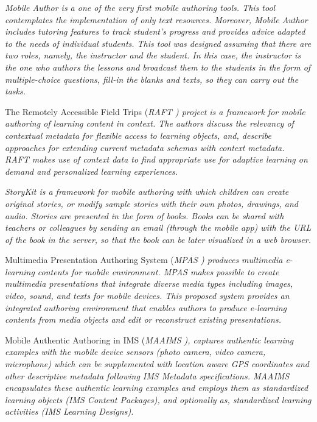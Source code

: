 \begin{small}

\em Mobile Author \em \cite{Virvou2005} is a one of the very first mobile authoring tools. This tool contemplates the implementation of only text resources. Moreover, \em Mobile Author \em includes tutoring features to track student’s progress and provides advice adapted to the needs of individual students. This tool was designed assuming that there are two roles, namely, the instructor and the student. In this case, the instructor is the one who authors the lessons and broadcast them to the students in the form of multiple-choice questions, fill-in the blanks and texts, so they can carry out the tasks.

The Remotely Accessible Field Trips (\em RAFT \em) project \cite{Duval2009} is a framework for mobile authoring of learning content in context. The authors discuss the relevancy of contextual metadata for flexible access to learning objects, and, describe approaches for extending current metadata schemas with context metadata. \em RAFT \em makes use of context data to find appropriate use for adaptive learning on demand and personalized learning experiences.

\em StoryKit \em \cite{Bonsignore2013} is a framework for mobile authoring with which children can create original stories, or modify sample stories with their own photos, drawings, and audio. Stories are presented in the form of books. Books can be shared with teachers or colleagues by sending an email (through the mobile app) with the URL of the book in the server, so that the book can be later visualized in a web browser.

Multimedia Presentation Authoring System (\em MPAS \em) \cite{Kim2012} produces multimedia e-learning contents for mobile environment. \em MPAS \em makes possible to create multimedia presentations that integrate diverse media types including images, video, sound, and texts for mobile devices. This proposed system provides an integrated authoring environment that enables authors to produce e-learning contents from media objects and edit or reconstruct existing presentations.

Mobile Authentic Authoring in IMS (\em MAAIMS \em), \cite{Jesse2012} captures authentic learning examples with the mobile device sensors (photo camera, video camera, microphone) which can be supplemented with location aware GPS coordinates and other descriptive metadata following IMS Metadata specifications. \em MAAIMS \em encapsulates these authentic learning examples and employs them as standardized learning objects (IMS Content Packages), and optionally as, standardized learning activities (IMS Learning Designs).


\end{small}
